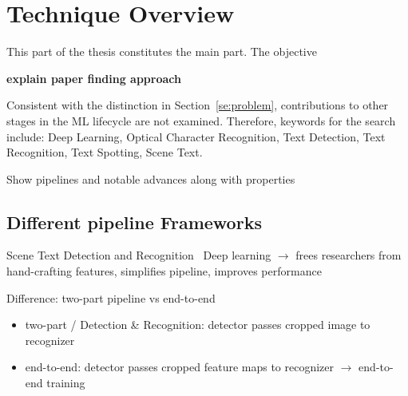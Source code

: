 \chapter{Technique Overview}\label{ch:research}
This part of the thesis constitutes the main part.
The objective

\textbf{explain paper finding approach}
\begin{comment}
- Wie rigorous? literatur methodik
    - entweder bestimmte Suchmaschinen oder bestimmte Publikationen
    - Eher Suchmaschinen
        -> Scholar
        -> hoch zitiert (Zotero: automatisch Zitationen beschaffen)
        -> weniger Keywordbasiert, mehr einfach graphbasiert Suche: zitierende Paper -> iterieren
    - Dokumentierung: So war vorgehen, die Paper sind dabei raus gekommen
    - Literatursammlung als BibTex

In order to create the overview the necessary steps in the process of \ac{STS} meed to be highlighted,
from preprocessing to classifying the identified text~\citep{long_scene_2021, sourvanos_challenges_2018}.
The ways in which the respective issues for the steps are solved need to be
identified from literature, listed and explained alongside.
\end{comment}

Consistent with the distinction in Section~\ref{se:problem}, contributions to other stages in the
\ac{ML} lifecycle are not examined.
Therefore, keywords for the search include: Deep Learning, Optical Character Recognition,
Text Detection, Text Recognition, Text Spotting, Scene Text.

Show pipelines and notable advances along with properties

\section{Different pipeline Frameworks}

Scene Text Detection and Recognition~\cite{long_scene_2021}
Deep learning $\rightarrow$ frees researchers from hand-crafting features, simplifies pipeline,
    improves performance

Difference: two-part pipeline vs end-to-end
\begin{itemize}
    \item two-part / Detection \& Recognition: detector passes cropped image to recognizer
    \item end-to-end: detector passes cropped feature maps to recognizer $\rightarrow$ end-to-end
            training
\end{itemize}

